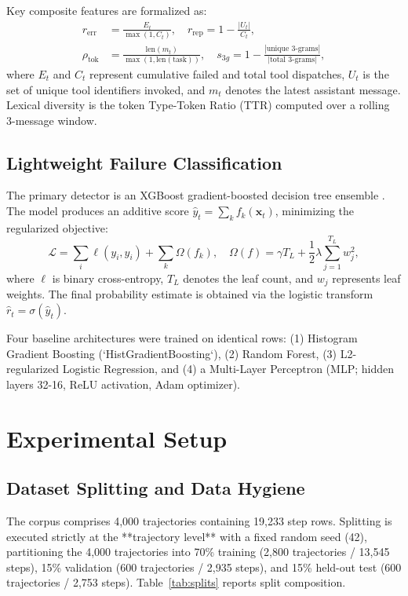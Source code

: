 \documentclass[journal,compsoc]{IEEEtran}
\begin{document}
Key composite features are formalized as:
\begin{align}
r_{\text{err}} &= \frac{E_t}{\max(1, C_t)}, \quad
r_{\text{rep}} = 1 - \frac{|U_t|}{C_t}, \\
\rho_{\text{tok}} &= \frac{\text{len}(m_t)}{\max(1, \text{len}(\text{task}))}, \quad
s_{3g} = 1 - \frac{|\text{unique 3-grams}|}{|\text{total 3-grams}|},
\end{align}
where $E_t$ and $C_t$ represent cumulative failed and total tool dispatches, $U_t$ is the set of unique tool identifiers invoked, and $m_t$ denotes the latest assistant message. Lexical diversity is the token Type-Token Ratio (TTR) computed over a rolling 3-message window.

\subsection{Lightweight Failure Classification}
The primary detector is an XGBoost gradient-boosted decision tree ensemble \cite{chen2016xgboost}. The model produces an additive score $\hat{y}_t = \sum_k f_k(\mathbf{x}_t)$, minimizing the regularized objective:
\begin{equation}
\mathcal{L} = \sum_{i} \ell(y_i, \hat{y}_i) + \sum_{k} \Omega(f_k), \quad \Omega(f) = \gamma T_L + \frac{1}{2}\lambda \sum_{j=1}^{T_L} w_j^2,
\end{equation}
where $\ell$ is binary cross-entropy, $T_L$ denotes the leaf count, and $w_j$ represents leaf weights. The final probability estimate is obtained via the logistic transform $\hat{r}_t = \sigma(\hat{y}_t)$.

Four baseline architectures were trained on identical rows: (1) Histogram Gradient Boosting (`HistGradientBoosting`), (2) Random Forest, (3) L2-regularized Logistic Regression, and (4) a Multi-Layer Perceptron (MLP; hidden layers 32-16, ReLU activation, Adam optimizer).

\section{Experimental Setup}

\subsection{Dataset Splitting and Data Hygiene}
The corpus comprises 4,000 trajectories containing 19,233 step rows. Splitting is executed strictly at the **trajectory level** with a fixed random seed (42), partitioning the 4,000 trajectories into 70\% training (2,800 trajectories / 13,545 steps), 15\% validation (600 trajectories / 2,935 steps), and 15\% held-out test (600 trajectories / 2,753 steps). Table~\ref{tab:splits} reports split composition.
\end{document}

